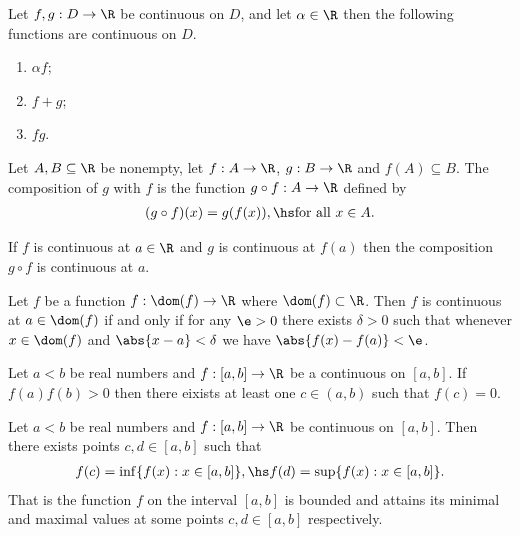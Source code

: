 \documentclass{article}
\begin{document}
\begin{theorem}[Notes 1.10]
    Let $f,g:D\to\R$ be continuous on $D$, and let $\alpha\in\R$ then the following functions
    are continuous on $D$.
    \begin{enumerate}
        \item $\alpha f$;
        \item $f+g$;
        \item $fg$.
    \end{enumerate}
\end{theorem}

\begin{definition}[Notes 1.8]
    Let $A,B\subseteq\R$ be nonempty, let $f:A\to\R$, $g:B\to\R$ and $f(A)\subseteq B$. The
    composition of $g$ with $f$ is the function $g\circ f:A\to\R$ defined by
    \begin{align*}
        (g\circ f)(x) = g(f(x)),\hs \text{for all }x\in A.
    \end{align*}
\end{definition}

\begin{theorem}[Notes 1.11]
    If $f$ is continuous at $a\in\R$ and $g$ is continuous at $f(a)$ then the composition
    $g\circ f$ is continuous at $a$.
\end{theorem}

\begin{theorem}[Notes 1.12]
    Let $f$ be a function $f:\dom(f)\to\R$ where $\dom(f)\subset\R$. Then $f$ is continuous
    at $a\in\dom(f)$ if and only if for any $\e>0$ there exists $\delta>0$ such that
    whenever $x\in\dom(f)$ and $\abs{x-a}<\delta$ we have $\abs{f(x)-f(a)}<\e$.
\end{theorem}

\begin{theorem}
    Let $a<b$ be real numbers and $f:[a,b]\to\R$ be a continuous on $[a,b]$.
    If $f(a)f(b)>0$ then there eixists at least one $c\in(a,b)$ such that $f(c)=0$.
\end{theorem}

\begin{theorem}
    Let $a<b$ be real numbers and $f:[a,b]\to\R$ be continuous on $[a,b]$. Then
    there exists points $c,d\in[a,b]$ such that
    \begin{align*}
        f(c) = \inf\{f(x):x\in[a,b]\},\hs f(d)=\sup\{f(x):x\in[a,b]\}.
    \end{align*}
    That is the function $f$ on the interval $[a,b]$ is bounded and attains its minimal
    and maximal values at some points $c,d\in[a,b]$ respectively.
\end{theorem}
\end{document}
